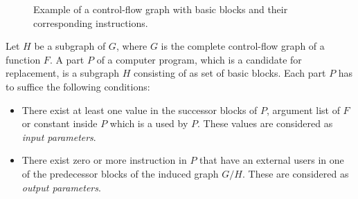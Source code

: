 \begin{figure}[htp] 
\caption{Example of a control-flow graph with basic blocks and their corresponding instructions.}
\label{fig:cfgexample}
\end{figure}

\begin{defn} Let $H$ be a subgraph of $G$, where $G$ is the complete control-flow graph of a function $F$. A part $P$ of a computer program, which is a candidate for replacement, is a subgraph $H$ consisting of as set of basic blocks. Each part $P$ has to suffice the following conditions:
\begin{itemize}
\label{def:program_part}

\item There exist at least one value in the successor blocks of $P$, argument list of $F$ or constant inside $P$ which is a used by $P$. These values are considered as \textit{input parameters}.
\item There exist zero or more instruction in $P$ that have an external users in one of the predecessor blocks of the induced graph $G/H$. These are considered as \textit{output parameters}.
\end{itemize}

\end{defn}

